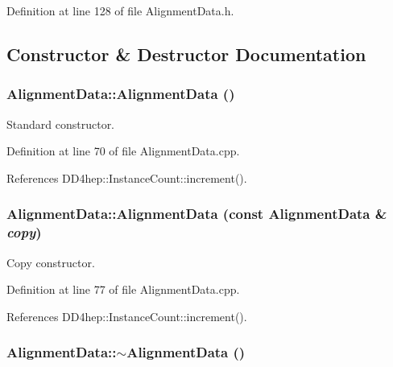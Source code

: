 Definition at line 128 of file AlignmentData.h.

\subsection{Constructor \& Destructor Documentation}
\hypertarget{class_d_d4hep_1_1_alignments_1_1_alignment_data_a0147080f238040fbab7467bb22ade3dc}{
\subsubsection[{AlignmentData}]{\setlength{\rightskip}{0pt plus 5cm}AlignmentData::AlignmentData ()}}
\label{class_d_d4hep_1_1_alignments_1_1_alignment_data_a0147080f238040fbab7467bb22ade3dc}


Standard constructor. 

Definition at line 70 of file AlignmentData.cpp.

References DD4hep::InstanceCount::increment().\hypertarget{class_d_d4hep_1_1_alignments_1_1_alignment_data_a5bb5d24d5baeef53da5feac655612362}{
\subsubsection[{AlignmentData}]{\setlength{\rightskip}{0pt plus 5cm}AlignmentData::AlignmentData (const {\bf AlignmentData} \& {\em copy})}}
\label{class_d_d4hep_1_1_alignments_1_1_alignment_data_a5bb5d24d5baeef53da5feac655612362}


Copy constructor. 

Definition at line 77 of file AlignmentData.cpp.

References DD4hep::InstanceCount::increment().\hypertarget{class_d_d4hep_1_1_alignments_1_1_alignment_data_a1bbd0f76cea046a48fdeee46396b6e5c}{
\subsubsection[{$\sim$AlignmentData}]{\setlength{\rightskip}{0pt plus 5cm}AlignmentData::$\sim$AlignmentData ()}}
\label{class_d_d4hep_1_1_alignments_1_1_alignment_data_a1bbd0f76cea046a48fdeee46396b6e5c}


